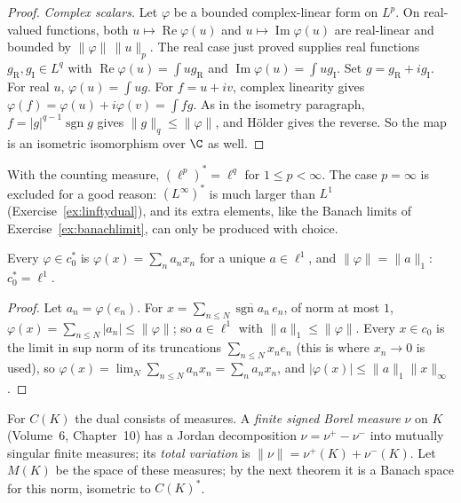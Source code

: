 \begin{proof}
\emph{Complex scalars.} Let $\varphi$ be a bounded complex-linear form on $L^p$. On real-valued functions, both $u\mapsto\operatorname{Re}\varphi(u)$ and $u\mapsto\operatorname{Im}\varphi(u)$ are real-linear and bounded by $\|\varphi\|\,\|u\|_p$. The real case just proved supplies real functions $g_{\mathrm R},g_{\mathrm I}\in L^q$ with $\operatorname{Re}\varphi(u)=\int ug_{\mathrm R}$ and $\operatorname{Im}\varphi(u)=\int ug_{\mathrm I}$. Set $g=g_{\mathrm R}+ig_{\mathrm I}$. For real $u$, $\varphi(u)=\int ug$. For $f=u+iv$, complex linearity gives $\varphi(f)=\varphi(u)+i\varphi(v)=\int fg$. As in the isometry paragraph, $f=|g|^{q-1}\operatorname{sgn}g$ gives $\|g\|_q\le\|\varphi\|$, and H\"older gives the reverse. So the map is an isometric isomorphism over $\C$ as well.
\end{proof}

With the counting measure, $(\ell^p)^*=\ell^q$ for $1\le p<\infty$. The case $p=\infty$ is excluded for a good reason: $(L^\infty)^*$ is much larger than $L^1$ (Exercise~\ref{ex:linftydual}), and its extra elements, like the
Banach limits of Exercise~\ref{ex:banachlimit}, can only be produced with choice.

\begin{proposition}\label{prop:c0dual}
Every $\varphi\in c_0^*$ is $\varphi(x)=\sum_na_nx_n$ for a unique $a\in\ell^1$, and $\|\varphi\|=\|a\|_1$: $c_0^*=\ell^1$.
\end{proposition}
\begin{proof}
Let $a_n=\varphi(e_n)$. For $x=\sum_{n\le N}\overline{\operatorname{sgn}a_n}\,e_n$, of norm at most $1$, $\varphi(x)=\sum_{n\le N}|a_n|\le\|\varphi\|$; so $a\in\ell^1$ with $\|a\|_1\le\|\varphi\|$. Every $x\in c_0$ is the limit in sup norm of its
truncations $\sum_{n\le N}x_ne_n$ (this is where $x_n\to0$ is used), so $\varphi(x)=\lim_N\sum_{n\le N}a_nx_n=\sum_na_nx_n$, and $|\varphi(x)|\le\|a\|_1\|x\|_\infty$.
\end{proof}

For $C(K)$ the dual consists of measures. A \emph{finite signed Borel measure} $\nu$ on $K$ (Volume~6, Chapter~10) has a Jordan decomposition $\nu=\nu^+-\nu^-$ into mutually singular finite measures; its \emph{total variation}
is $\|\nu\|=\nu^+(K)+\nu^-(K)$. Let $M(K)$ be the space of these measures; by the next theorem it is a Banach space for this norm, isometric to $C(K)^*$.

